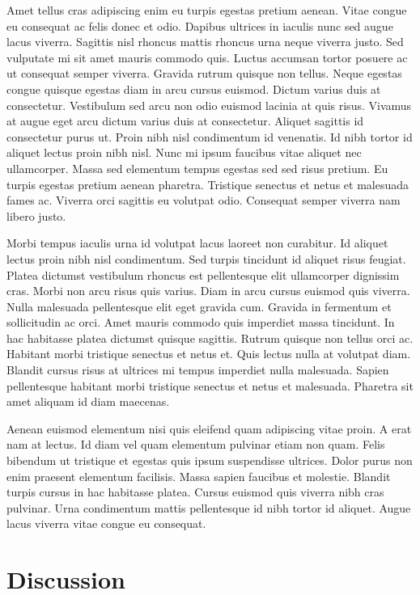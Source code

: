 \documentclass[
]{article}
\begin{document}
Amet tellus cras adipiscing enim eu turpis egestas pretium aenean. Vitae congue eu consequat ac felis donec et odio. Dapibus ultrices in iaculis nunc sed augue lacus viverra. Sagittis nisl rhoncus mattis rhoncus urna neque viverra justo. Sed vulputate mi sit amet mauris commodo quis. Luctus accumsan tortor posuere ac ut consequat semper viverra. Gravida rutrum quisque non tellus. Neque egestas congue quisque egestas diam in arcu cursus euismod. Dictum varius duis at consectetur. Vestibulum sed arcu non odio euismod lacinia at quis risus. Vivamus at augue eget arcu dictum varius duis at consectetur. Aliquet sagittis id consectetur purus ut. Proin nibh nisl condimentum id venenatis. Id nibh tortor id aliquet lectus proin nibh nisl. Nunc mi ipsum faucibus vitae aliquet nec ullamcorper. Massa sed elementum tempus egestas sed sed risus pretium. Eu turpis egestas pretium aenean pharetra. Tristique senectus et netus et malesuada fames ac. Viverra orci sagittis eu volutpat odio. Consequat semper viverra nam libero justo.

Morbi tempus iaculis urna id volutpat lacus laoreet non curabitur. Id aliquet lectus proin nibh nisl condimentum. Sed turpis tincidunt id aliquet risus feugiat. Platea dictumst vestibulum rhoncus est pellentesque elit ullamcorper dignissim cras. Morbi non arcu risus quis varius. Diam in arcu cursus euismod quis viverra. Nulla malesuada pellentesque elit eget gravida cum. Gravida in fermentum et sollicitudin ac orci. Amet mauris commodo quis imperdiet massa tincidunt. In hac habitasse platea dictumst quisque sagittis. Rutrum quisque non tellus orci ac. Habitant morbi tristique senectus et netus et. Quis lectus nulla at volutpat diam. Blandit cursus risus at ultrices mi tempus imperdiet nulla malesuada. Sapien pellentesque habitant morbi tristique senectus et netus et malesuada. Pharetra sit amet aliquam id diam maecenas.

Aenean euismod elementum nisi quis eleifend quam adipiscing vitae proin. A erat nam at lectus. Id diam vel quam elementum pulvinar etiam non quam. Felis bibendum ut tristique et egestas quis ipsum suspendisse ultrices. Dolor purus non enim praesent elementum facilisis. Massa sapien faucibus et molestie. Blandit turpis cursus in hac habitasse platea. Cursus euismod quis viverra nibh cras pulvinar. Urna condimentum mattis pellentesque id nibh tortor id aliquet. Augue lacus viverra vitae congue eu consequat.

\hypertarget{discussion}{%
\section{Discussion}\label{discussion}}
\end{document}
